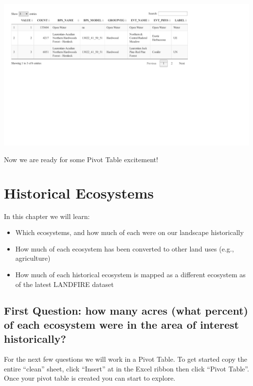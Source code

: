 \documentclass[
]{book}
\providecommand{\tightlist}{%
  \setlength{\itemsep}{0pt}\setlength{\parskip}{0pt}}
\begin{document}
\includegraphics{FSCBook_files/figure-latex/combineCleanDT-1.pdf}

Now we are ready for some Pivot Table excitement!

\hypertarget{historicalEcosystems}{%
\chapter{Historical Ecosystems}\label{historicalEcosystems}}

In this chapter we will learn:

\begin{itemize}
\tightlist
\item
  Which ecosystems, and how much of each were on our landscape historically
\item
  How much of each ecosystem has been converted to other land uses (e.g., agriculture)
\item
  How much of each historical ecosystem is mapped as a different ecosystem as of the latest LANDFIRE dataset
\end{itemize}

\hypertarget{first-question-how-many-acres-what-percent-of-each-ecosystem-were-in-the-area-of-interest-historically}{%
\section{First Question: how many acres (what percent) of each ecosystem were in the area of interest historically?}\label{first-question-how-many-acres-what-percent-of-each-ecosystem-were-in-the-area-of-interest-historically}}

For the next few questions we will work in a Pivot Table. To get started copy the entire ``clean'' sheet, click ``Insert'' at in the Excel ribbon then click ``Pivot Table''. Once your pivot table is created you can start to explore.
\end{document}
